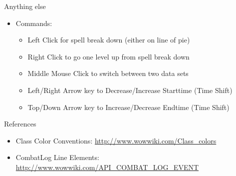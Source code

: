 \documentclass{beamer}
\begin{document}
\begin{frame}{Anything else}
\begin{itemize}
	\item Commands:
	\begin{itemize}
		\item Left Click for spell break down (either on line of pie)
		\item Right Click to go one level up from spell break down
		\item Middle Mouse Click to switch between two data sets
		\item Left/Right Arrow key to Decrease/Increase Starttime (Time Shift)
		\item Top/Down Arrow key to Increase/Decrease Endtime (Time Shift)
	\end{itemize}
\end{itemize}
\end{frame}

\begin{frame}{References}
\begin{itemize}
	\item Class Color Conventions: \url{http://www.wowwiki.com/Class_colors}
	\item CombatLog Line Elements: \url{http://www.wowwiki.com/API_COMBAT_LOG_EVENT}
\end{itemize}
\end{frame}
\end{document}
